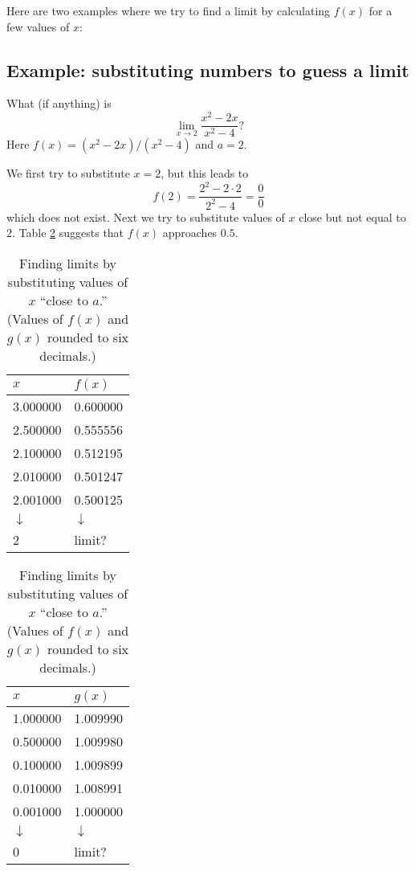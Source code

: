 Here are two examples where we try to find a limit by calculating
$f(x)$ for a few values of $x$:

\subsection{Example: substituting numbers to guess a limit} 
\label{ex:limit-by-sub-good}
What (if anything) is
\[
\lim_{x\to 2}\frac{x^2 -2x}{x^2-4}?
\]
Here $f(x) = (x^2 - 2x)/(x^2-4)$ and $a=2$.


We first try to substitute $x=2$, but this leads to
\[
f(2) = \frac{2^2 - 2\cdot2}{2^2-4} = \frac 00
\]
which does not exist.  Next we try to substitute values of $x$ close but
not equal to $2$.  Table \ref{tbl:finding-limits} suggests that $f(x)$
approaches $0.5$.


\begin{table}[ht]
  \centering
  \begin{tabular}{ll}
    \toprule
    \quad$x$ & \quad$f(x)$ \\
    \midrule
    3.000000 & 0.600000\\
    2.500000 & 0.555556\\
    2.100000 & 0.512195\\
    2.010000 & 0.501247\\
    2.001000 & 0.500125\\
    $\downarrow$& \hfil$\downarrow$\hfil\\
    2 & \hfil limit?\hfil\\
    \bottomrule
  \end{tabular}
  \qquad\qquad
  \begin{tabular}{ll}
    \toprule
    \quad$x$ & \quad$g(x)$ \\
    \midrule
    1.000000 & 1.009990\\
    0.500000 & 1.009980\\
    0.100000 & 1.009899\\
    0.010000 & 1.008991\\
    0.001000 & 1.000000\\
    $\downarrow$& \hfil$\downarrow$\hfil\\
    0& \hfil limit?\hfil\\
    \bottomrule
  \end{tabular}
  \smallskip
  
  \caption{Finding limits by substituting values of $x$ ``close to $a$.''
    (Values of $f(x)$ and $g(x)$ rounded to six decimals.)}
  \label{tbl:finding-limits}
\end{table}  

